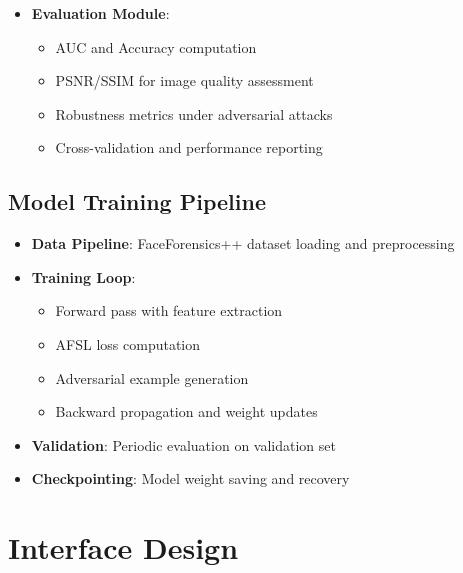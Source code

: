 \documentclass[a4paper,12pt]{article}
\begin{document}
\begin{itemize}
    \item \textbf{Evaluation Module}: 
    \begin{itemize}
        \item AUC and Accuracy computation
        \item PSNR/SSIM for image quality assessment
        \item Robustness metrics under adversarial attacks
        \item Cross-validation and performance reporting
    \end{itemize}
\end{itemize}

\subsection{Model Training Pipeline}
\begin{itemize}
    \item \textbf{Data Pipeline}: FaceForensics++ dataset loading and preprocessing
    \item \textbf{Training Loop}: 
    \begin{itemize}
        \item Forward pass with feature extraction
        \item AFSL loss computation
        \item Adversarial example generation
        \item Backward propagation and weight updates
    \end{itemize}
    \item \textbf{Validation}: Periodic evaluation on validation set
    \item \textbf{Checkpointing}: Model weight saving and recovery
\end{itemize}

\newpage
\section{Interface Design}
\end{document}
